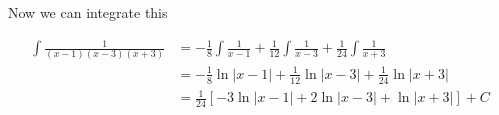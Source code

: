 \documentclass[a4paper]{article}
\begin{document}
Now we can integrate this

\begin{align*}
	\int \frac{1}{(x-1)(x-3)(x+3)} &= -\frac{1}{8}\int \frac{1}{x-1} + \frac{1}{12}\int \frac{1}{x-3} + \frac{1}{24}\int \frac{1}{x+3}  \\
	&= -\frac{1}{8}\ln|x-1| +\frac{1}{12}\ln|x-3| + \frac{1}{24}\ln|x+3| \\
	&= \frac{1}{24}\left[-3\ln|x-1| +2\ln|x-3| +\ln|x+3|\right] + C
\end{align*}
\end{document}
